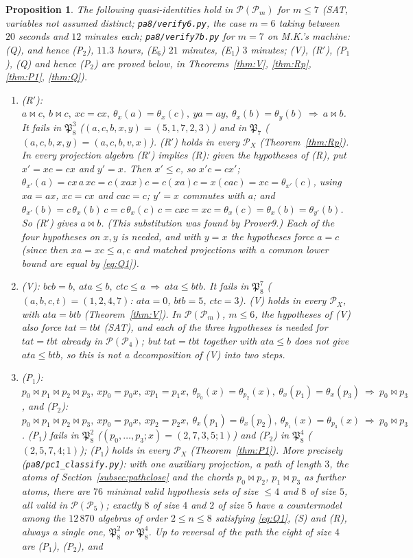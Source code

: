 \documentclass[11pt]{amsart}
\newtheorem{proposition}[theorem]{Proposition}
\theoremstyle{definition}
\renewcommand{\P}{\mathcal{P}}
\begin{document}
\begin{proposition}\label{prop:census8}
The following quasi-identities hold in $\P(\P_m)$ for $m\le7$ (SAT, variables not assumed distinct; \texttt{pa8/verify6.py}, the case $m=6$ taking between $20$ seconds and $12$ minutes each; \texttt{pa8/verify7b.py} for $m=7$ on M.K.'s machine: (Q), and hence (P$_2$), $11.3$ hours, (E$_6$) $21$ minutes, (E$_1$) $3$ minutes; (V), (R$'$), (P$_1$), (Q) and hence (P$_2$) are proved below, in Theorems~\ref{thm:V}, \ref{thm:Rp}, \ref{thm:P1}, \ref{thm:Q}).
\begin{enumerate}[label=\textup{(\alph*)},nosep]
\item \textup{(R$'$)}: $a\bowtie c,\ b\bowtie c,\ xc=cx,\ \theta_x(a)=\theta_x(c),\ ya=ay,\ \theta_x(b)=\theta_y(b)\ \Longrightarrow\ a\bowtie b$. It fails in $\mathfrak P_8^3$ ($(a,c,b,x,y)=(5,1,7,2,3)$) and in $\mathfrak P_7$ ($(a,c,b,x,y)=(a,c,b,v,x)$). (R$'$) holds in every $\P_X$ (Theorem~\ref{thm:Rp}). In every projection algebra (R$'$) implies (R): given the hypotheses of (R), put $x'=xc=cx$ and $y'=x$. Then $x'\le c$, so $x'c=cx'$; $\theta_{x'}(a)=cx\,a\,xc=c(xax)c=c(xa)c=x(cac)=xc=\theta_{x'}(c)$, using $xa=ax$, $xc=cx$ and $cac=c$; $y'=x$ commutes with $a$; and $\theta_{x'}(b)=c\,\theta_x(b)\,c=c\,\theta_x(c)\,c=cxc=xc=\theta_x(c)=\theta_x(b)=\theta_{y'}(b)$. So (R$'$) gives $a\bowtie b$. (This substitution was found by Prover9.) Each of the four hypotheses on $x,y$ is needed, and with $y=x$ the hypotheses force $a=c$ (since then $xa=xc\le a,c$ and matched projections with a common lower bound are equal by \eqref{eq:Q1}).
\item \textup{(V)}: $bcb=b,\ ata\le b,\ ctc\le a\ \Longrightarrow\ ata\le btb$. It fails in $\mathfrak P_8^7$ ($(a,b,c,t)=(1,2,4,7)$: $ata=0$, $btb=5$, $ctc=3$). (V) holds in every $\P_X$, with $ata=btb$ (Theorem~\ref{thm:V}). In $\P(\P_m)$, $m\le6$, the hypotheses of (V) also force $tat=tbt$ (SAT), and each of the three hypotheses is needed for $tat=tbt$ already in $\P(\P_4)$; but $tat=tbt$ together with $ata\le b$ does not give $ata\le btb$, so this is not a decomposition of (V) into two steps.
\item \textup{(P$_1$)}: $p_0\bowtie p_1\bowtie p_2\bowtie p_3,\ xp_0=p_0x,\ xp_1=p_1x,\ \theta_{p_0}(x)=\theta_{p_2}(x),\ \theta_x(p_1)=\theta_x(p_3)\ \Longrightarrow\ p_0\bowtie p_3$, and \textup{(P$_2$)}: $p_0\bowtie p_1\bowtie p_2\bowtie p_3,\ xp_0=p_0x,\ xp_2=p_2x,\ \theta_x(p_1)=\theta_x(p_2),\ \theta_{p_1}(x)=\theta_{p_3}(x)\ \Longrightarrow\ p_0\bowtie p_3$. (P$_1$) fails in $\mathfrak P_8^2$ ($(p_0,\dots,p_3;x)=(2,7,3,5;1)$) and (P$_2$) in $\mathfrak P_8^4$ ($(2,5,7,4;1)$); (P$_1$) holds in every $\P_X$ (Theorem~\ref{thm:P1}). More precisely (\texttt{pa8/pc1\_classify.py}): with one auxiliary projection, a path of length $3$, the atoms of Section~\ref{subsec:pathclose} and the chords $p_0\bowtie p_2$, $p_1\bowtie p_3$ as further atoms, there are $76$ minimal valid hypothesis sets of size $\le4$ and $8$ of size $5$, all valid in $\P(\P_5)$; exactly $8$ of size $4$ and $2$ of size $5$ have a countermodel among the $12\,870$ algebras of order $2\le n\le8$ satisfying \eqref{eq:Q1}, (S) and (R), always a single one, $\mathfrak P_8^2$ or $\mathfrak P_8^4$. Up to reversal of the path the eight of size $4$ are (P$_1$), (P$_2$), and

\end{enumerate}
\end{proposition}
\end{document}
